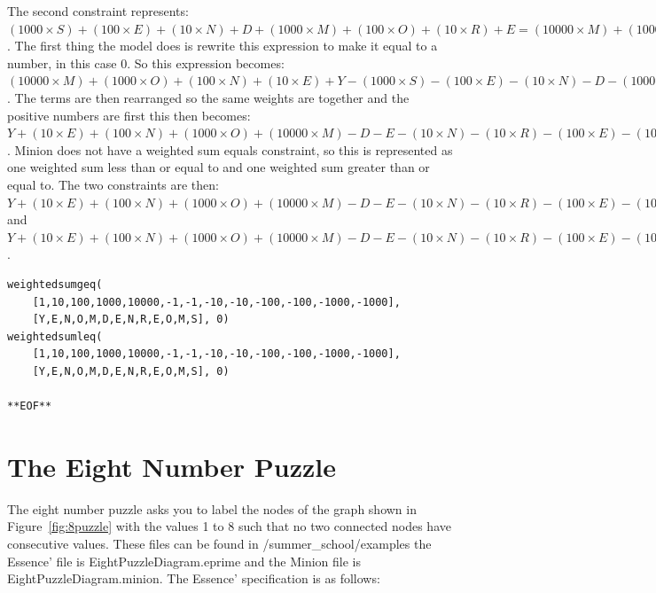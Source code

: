 \documentclass[oneside]{book}
\begin{document}
The second constraint represents:$(1000 \times S) + (100 \times E) + (10 \times N) + D +  (1000 \times M) + (100 \times O )+ (10 \times R) + E = (10000 \times M) + (1000 \times O) + (100 \times N) + (10 \times E) + Y$.  The first thing the model does is rewrite this expression to make it equal to a number, in this case 0. So this expression becomes: $(10000 \times M) + (1000 \times O) + (100 \times N) + (10 \times E) + Y - (1000 \times S)  - (100 \times E) - (10 \times N) - D - (1000 \times M) - (100 \times O) - (10 \times R) - E = 0$. The terms are then rearranged so the same weights are together and the positive numbers are first this then becomes: $Y + (10 \times E) + (100 \times N) + (1000 \times O) + (10000 \times M) -D - E - (10 \times N) - (10 \times R) - (100 \times E) - (100 \times O)  - (1000 \times M) - (1000 \times S) = 0$. Minion does not have a weighted sum equals constraint, so this is represented as one weighted sum less than or equal to and one weighted sum greater than or equal to. The two constraints are then: $Y + (10 \times E) + (100 \times N) + (1000 \times O) + (10000 \times M) -D - E - (10 \times N) - (10 \times R) - (100 \times E) - (100 \times O)  - (1000 \times M) - (1000 \times S) \leq 0$ and $Y + (10 \times E) + (100 \times N) + (1000 \times O) + (10000 \times M) -D - E - (10 \times N) - (10 \times R) - (100 \times E) - (100 \times O)  - (1000 \times M) - (1000 \times S) \geq 0$.

\begin{verbatim}
weightedsumgeq(
	[1,10,100,1000,10000,-1,-1,-10,-10,-100,-100,-1000,-1000], 
	[Y,E,N,O,M,D,E,N,R,E,O,M,S], 0)
weightedsumleq(
	[1,10,100,1000,10000,-1,-1,-10,-10,-100,-100,-1000,-1000],
	[Y,E,N,O,M,D,E,N,R,E,O,M,S], 0)

**EOF**
\end{verbatim}

\section{The Eight Number Puzzle}
The eight number puzzle asks you to label the nodes of the graph shown in Figure~\ref{fig:8puzzle} with the values 1 to 8 such that no two connected nodes have consecutive values.  These files can be found in /summer\_school/examples the Essence' file is EightPuzzleDiagram.eprime and the Minion file is EightPuzzleDiagram.minion. The Essence' specification is as follows:
\end{document}
